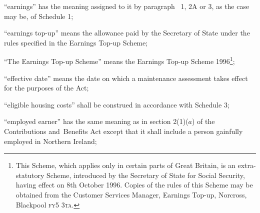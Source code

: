 \documentclass[12pt,a4paper]{article}
\begin{document}
\begin{enumerate}
“earnings” has the meaning assigned to it by paragraph~
1, 2A or 3,  %
as the case may be, of Schedule 1;

“earnings top-up” means the allowance paid by the Secretary of State under the rules specified in the Earnings Top-up Scheme;

“The Earnings Top-up Scheme” means the Earnings Top-up Scheme 1996\footnote{\frenchspacing This Scheme, which applies only in certain parts of Great Britain, is an extra-statutory Scheme, introduced by the Secretary of State for Social Security, having effect on 8th October 1996. Copies of the rules of this Scheme may be obtained from the Customer Services Manager, Earnings Top-up, Norcross, Blackpool \textsc{fy5 3ta}.};

“effective date” means the date on which a maintenance assessment takes effect for the purposes of the Act;

“eligible housing costs” shall be construed in accordance with Schedule 3;

“employed earner” has the same meaning as in section 2(1)($a$) of the Contributions and~Benefits Act
except that it shall include a person gainfully employed in Northern Ireland;  %

%


\end{enumerate}
\end{document}
